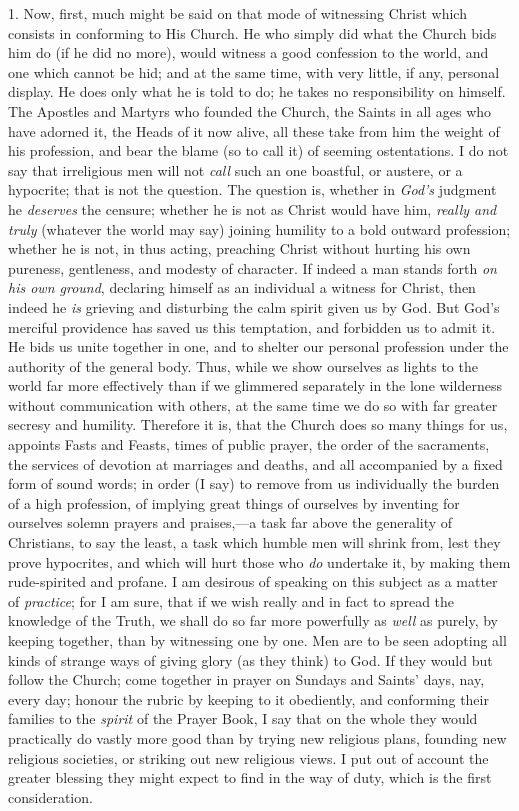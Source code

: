 1. Now, first, much might be said on that mode of
witnessing Christ which consists in conforming to His
Church. He who simply did what the Church bids him do (if
he did no more), would witness a good confession to the
world, and one which cannot be hid; and at the same time,
with very little, if any, personal display. He does only
what he is told to do; he takes no responsibility on
himself. The Apostles and Martyrs who founded the Church,
the Saints in all ages who have adorned it, the Heads of
it now alive, all these take from him the weight of his
profession, and bear the blame (so to call it) of seeming ostentations. I do not say that irreligious men will not \emph{call}
such an one boastful, or austere, or a hypocrite; that is
not the question. The question is, whether in \emph{God's}
judgment he \emph{deserves} the censure; whether he is
not as Christ would have him, \emph{really and truly}
(whatever the world may say) joining humility to a bold
outward profession; whether he is not, in thus acting,
preaching Christ without hurting his own pureness,
gentleness, and modesty of character. If indeed a man
stands forth \emph{on his own ground}, declaring
himself as an individual a witness for Christ, then
indeed he \emph{is} grieving and disturbing the calm
spirit given us by God. But God's merciful providence has
saved us this temptation, and forbidden us to admit it.
He bids us unite together in one, and to shelter our
personal profession under the authority of the general
body. Thus, while we show ourselves as lights to the
world far more effectively than if we glimmered
separately in the lone wilderness without communication
with others, at the same time we do so with far greater
secresy and humility. Therefore it is, that the Church
does so many things for us, appoints Fasts and Feasts,
times of public prayer, the order of the sacraments, the
services of devotion at marriages and deaths, and all
accompanied by a fixed form of sound words; in order (I
say) to remove from us individually the burden of a high
profession, of implying great things of ourselves by
inventing for ourselves solemn prayers and
praises,—a task far above the generality of
Christians, to say the least, a task which humble men
will shrink from, lest they prove hypocrites, and which
will hurt those who \emph{do} undertake it, by making
them rude-spirited and profane. I am desirous of speaking
on this subject as a matter of \emph{practice}; for I am
sure, that if we wish really and in fact to spread the
knowledge of the Truth, we shall do so far more
powerfully as \emph{well} as purely, by keeping together,
than by witnessing one by one. Men are to be seen
adopting all kinds of strange ways of giving glory (as
they think) to God. If they would but follow the Church;
come together in prayer on Sundays and Saints' days, nay,
every day; honour the rubric by keeping to it obediently,
and conforming their families to the \emph{spirit} of the
Prayer Book, I say that on the whole they would
practically do vastly more good than by trying new
religious plans, founding new religious societies, or
striking out new religious views. I put out of account
the greater blessing they might expect to find in the way
of duty, which is the first consideration.

